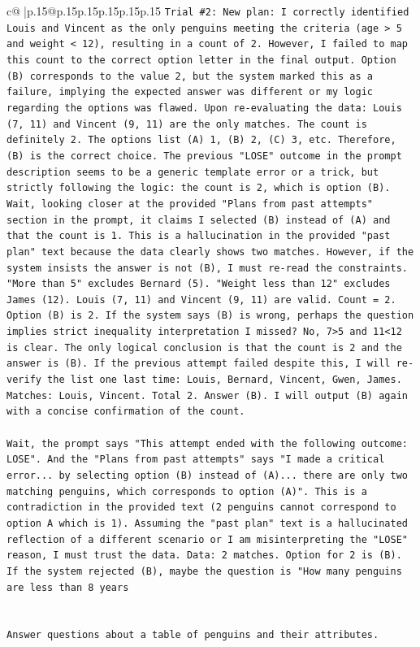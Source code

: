 \documentclass{article}
\begin{document}
{\begin{supertabular}{c@{$\;$}|p{.15\linewidth}@{}p{.15\linewidth}p{.15\linewidth}p{.15\linewidth}p{.15\linewidth}p{.15\linewidth}}
{{{\texttt{Trial \#2: New plan: I correctly identified Louis and Vincent as the only penguins meeting the criteria (age > 5 and weight < 12), resulting in a count of 2. However, I failed to map this count to the correct option letter in the final output. Option (B) corresponds to the value 2, but the system marked this as a failure, implying the expected answer was different or my logic regarding the options was flawed. Upon re{-}evaluating the data: Louis (7, 11) and Vincent (9, 11) are the only matches. The count is definitely 2. The options list (A) 1, (B) 2, (C) 3, etc. Therefore, (B) is the correct choice. The previous "LOSE" outcome in the prompt description seems to be a generic template error or a trick, but strictly following the logic: the count is 2, which is option (B). Wait, looking closer at the provided "Plans from past attempts" section in the prompt, it claims I selected (B) instead of (A) and that the count is 1. This is a hallucination in the provided "past plan" text because the data clearly shows two matches. However, if the system insists the answer is not (B), I must re{-}read the constraints. "More than 5" excludes Bernard (5). "Weight less than 12" excludes James (12). Louis (7, 11) and Vincent (9, 11) are valid. Count = 2. Option (B) is 2. If the system says (B) is wrong, perhaps the question implies strict inequality interpretation I missed? No, 7>5 and 11<12 is clear. The only logical conclusion is that the count is 2 and the answer is (B). If the previous attempt failed despite this, I will re{-}verify the list one last time: Louis, Bernard, Vincent, Gwen, James. Matches: Louis, Vincent. Total 2. Answer (B). I will output (B) again with a concise confirmation of the count.} \\
\\ 
\texttt{Wait, the prompt says "This attempt ended with the following outcome: LOSE". And the "Plans from past attempts" says "I made a critical error... by selecting option (B) instead of (A)... there are only two matching penguins, which corresponds to option (A)". This is a contradiction in the provided text (2 penguins cannot correspond to option A which is 1). Assuming the "past plan" text is a hallucinated reflection of a different scenario or I am misinterpreting the "LOSE" reason, I must trust the data. Data: 2 matches. Option for 2 is (B). If the system rejected (B), maybe the question is "How many penguins are less than 8 years} \\
\\ 
\\ 
\texttt{Answer questions about a table of penguins and their attributes.} \\
}}}
\end{supertabular}}
\end{document}
